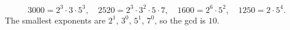 \[3000=2^3\cdot3\cdot5^3,\quad 2520=2^3\cdot3^2\cdot5\cdot7,\quad 1600=2^6\cdot5^2,\quad 1250=2\cdot5^4.\]
The smallest exponents are $2^1$, $3^0$, $5^1$, $7^0$, so the gcd is $\boxed{10}$.

